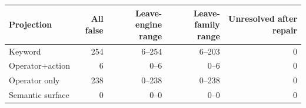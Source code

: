 \begin{tabular}{lrrrr}
\toprule
Projection & All false & Leave-engine range & Leave-family range & Unresolved after repair\\
\midrule
Keyword & 254 & 6--254 & 6--203 & 0\\
Operator+action & 6 & 0--6 & 0--6 & 0\\
Operator only & 238 & 0--238 & 0--238 & 0\\
Semantic surface & 0 & 0--0 & 0--0 & 0\\
\bottomrule
\end{tabular}

